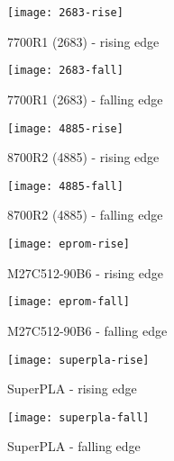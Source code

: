 \begin{figure}
    \begin{minipage}{0.45\linewidth}
        \centering
        \texttt{[image: 2683-rise]}
        \caption{7700R1 (2683) - rising edge}
        \label{fig:7700R1-2683-rise}
    \end{minipage}
    \hfill
    \begin{minipage}{0.45\linewidth}
        \centering
        \texttt{[image: 2683-fall]}
        \caption{7700R1 (2683) - falling edge}
        \label{fig:7700R1-2683-fall}
    \end{minipage}
\end{figure}

\begin{figure}
    \begin{minipage}{0.45\linewidth}
        \centering
        \texttt{[image: 4885-rise]}
        \caption{8700R2 (4885) - rising edge}
        \label{fig:8700R2-4885-rise}
    \end{minipage}
    \hfill
    \begin{minipage}{0.45\linewidth}
        \centering
        \texttt{[image: 4885-fall]}
        \caption{8700R2 (4885) - falling edge}
        \label{fig:8700R2-4885-fall}
    \end{minipage}
\end{figure}

\begin{figure}
    \begin{minipage}{0.45\linewidth}
        \centering
        \texttt{[image: eprom-rise]}
        \caption{M27C512-90B6 - rising edge}
        \label{fig:eprom-rise}
    \end{minipage}
    \hfill
    \begin{minipage}{0.45\linewidth}
        \centering
        \texttt{[image: eprom-fall]}
        \caption{M27C512-90B6 - falling edge}
        \label{fig:eprom-fall}
    \end{minipage}
\end{figure}

\begin{figure}
    \begin{minipage}{0.45\linewidth}
        \centering
        \texttt{[image: superpla-rise]}
        \caption{SuperPLA - rising edge}
        \label{fig:superpla-rise}
    \end{minipage}
    \hfill
    \begin{minipage}{0.45\linewidth}
        \centering
        \texttt{[image: superpla-fall]}
        \caption{SuperPLA - falling edge}
        \label{fig:superpla-fall}
    \end{minipage}
\end{figure}

